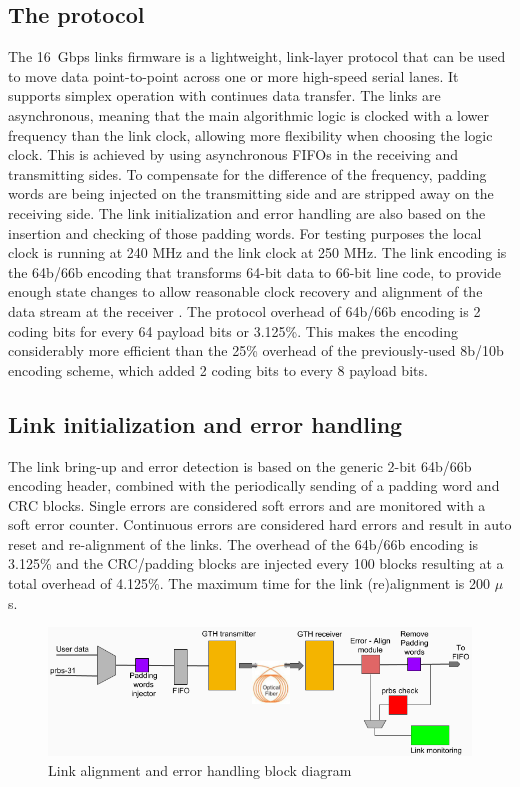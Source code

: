\documentclass[a4paper]{PoS}
\begin{document}
\subsection{The protocol}
The 16~Gbps links firmware is a lightweight, link-layer protocol that can be used to move data point-to-point across one or more high-speed serial lanes. It supports simplex operation with continues data transfer. The links are asynchronous, meaning that the main algorithmic logic is clocked with a lower frequency than the link clock, allowing more flexibility when choosing the logic clock. This is achieved by using asynchronous FIFOs in the receiving and transmitting sides. To compensate for the difference of the frequency, padding words are being injected on the transmitting side and are stripped away on the receiving side. The link initialization and error handling are also based on the insertion and checking of those padding words. For testing purposes the local clock is running at 240 MHz and the link clock at 250 MHz. The link encoding is the 64b/66b encoding that transforms 64-bit data to 66-bit line code, to provide enough state changes to allow reasonable clock recovery and alignment of the data stream at the receiver \cite{walker200064b}. The protocol overhead of 64b/66b encoding is 2 coding bits for every 64 payload bits or 3.125\%. This makes the encoding considerably more efficient than the 25\% overhead of the previously-used 8b/10b encoding scheme, which added 2 coding bits to every 8 payload bits.



\subsection{Link initialization and error handling}
The link bring-up and error detection is based on the generic 2-bit 64b/66b encoding header, combined with the periodically sending of a padding word and CRC blocks. Single errors are considered soft errors and are monitored with a soft error counter. Continuous errors are considered hard errors and result in auto reset and re-alignment of the links. The overhead of the 64b/66b encoding is 3.125\% and the CRC/padding blocks are injected every 100 blocks resulting at a total overhead of 4.125\%. The maximum time for the link (re)alignment is 200 $\mu$s.

\begin{figure}
\centering
\includegraphics[width=1\textwidth]{link_align.png}
\caption{Link alignment and error handling block diagram}
\label{align}
\end{figure}
\end{document}
